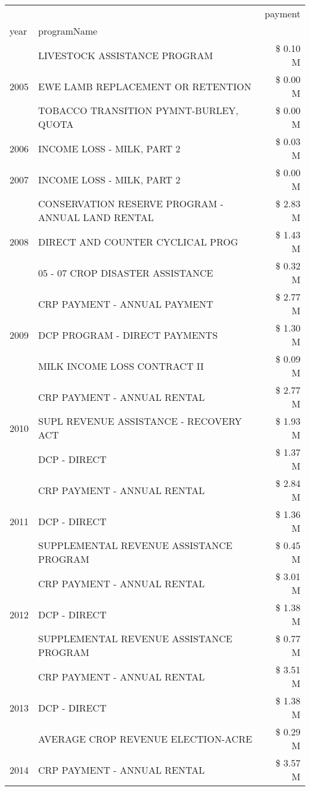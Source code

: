 \begin{tabular}{llr}
\toprule
 &  & payment \\
year & programName &  \\
\midrule
\multirow[t]{3}{*}{2005} & LIVESTOCK ASSISTANCE PROGRAM & \$ 0.10 M \\
 & EWE LAMB REPLACEMENT OR RETENTION & \$ 0.00 M \\
 & TOBACCO TRANSITION PYMNT-BURLEY, QUOTA & \$ 0.00 M \\
\cline{1-3}
2006 & INCOME LOSS - MILK, PART 2 & \$ 0.03 M \\
\cline{1-3}
2007 & INCOME LOSS - MILK, PART 2 & \$ 0.00 M \\
\cline{1-3}
\multirow[t]{3}{*}{2008} & CONSERVATION RESERVE PROGRAM - ANNUAL LAND RENTAL & \$ 2.83 M \\
 & DIRECT AND COUNTER CYCLICAL PROG & \$ 1.43 M \\
 & 05 - 07 CROP DISASTER ASSISTANCE & \$ 0.32 M \\
\cline{1-3}
\multirow[t]{3}{*}{2009} & CRP PAYMENT - ANNUAL PAYMENT & \$ 2.77 M \\
 & DCP PROGRAM - DIRECT PAYMENTS & \$ 1.30 M \\
 & MILK INCOME LOSS CONTRACT II & \$ 0.09 M \\
\cline{1-3}
\multirow[t]{3}{*}{2010} & CRP PAYMENT - ANNUAL RENTAL & \$ 2.77 M \\
 & SUPL REVENUE ASSISTANCE - RECOVERY ACT & \$ 1.93 M \\
 & DCP - DIRECT & \$ 1.37 M \\
\cline{1-3}
\multirow[t]{3}{*}{2011} & CRP PAYMENT - ANNUAL RENTAL & \$ 2.84 M \\
 & DCP - DIRECT & \$ 1.36 M \\
 & SUPPLEMENTAL REVENUE ASSISTANCE PROGRAM & \$ 0.45 M \\
\cline{1-3}
\multirow[t]{3}{*}{2012} & CRP PAYMENT - ANNUAL RENTAL & \$ 3.01 M \\
 & DCP - DIRECT & \$ 1.38 M \\
 & SUPPLEMENTAL REVENUE ASSISTANCE PROGRAM & \$ 0.77 M \\
\cline{1-3}
\multirow[t]{3}{*}{2013} & CRP PAYMENT - ANNUAL RENTAL & \$ 3.51 M \\
 & DCP - DIRECT & \$ 1.38 M \\
 & AVERAGE CROP REVENUE ELECTION-ACRE & \$ 0.29 M \\
\cline{1-3}
\multirow[t]{3}{*}{2014} & CRP PAYMENT - ANNUAL RENTAL & \$ 3.57 M \\

\end{tabular}
